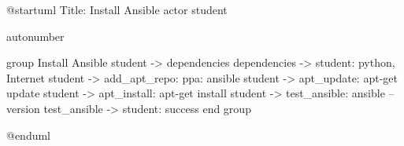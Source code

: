 @startuml
Title: Install Ansible
actor student

autonumber

group Install Ansible
  student -> dependencies
  dependencies -> student: python, Internet
  student -> add_apt_repo: ppa: ansible
  student -> apt_update: apt-get update
  student -> apt_install: apt-get install
  student -> test_ansible: ansible --version
  test_ansible -> student: success
end group

@enduml
